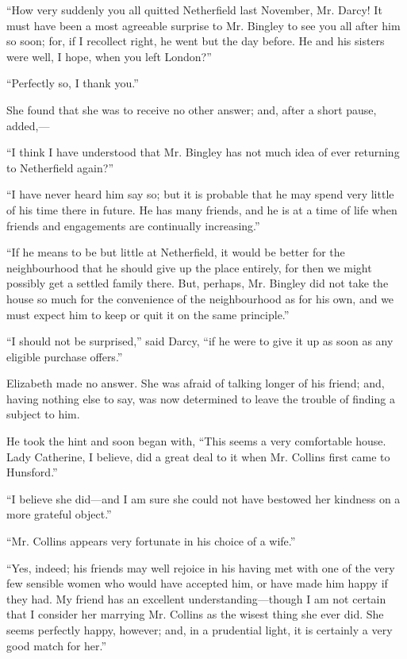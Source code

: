 \documentclass[12pt,openright]{book}
\begin{document}
“How very suddenly you all quitted Netherfield last November, Mr. Darcy! It must have been a most agreeable surprise to Mr. Bingley to see you all after him so soon; for, if I recollect right, he went but the day before. He and his sisters were well, I hope, when you left London?”

“Perfectly so, I thank you.”

She found that she was to receive no other answer; and, after a short pause, added,—

“I think I have understood that Mr. Bingley has not much idea of ever returning to Netherfield again?”

“I have never heard him say so; but it is probable that he may spend very little of his time there in future. He has many friends, and he is at a time of life when friends and engagements are continually increasing.”

“If he means to be but little at Netherfield, it would be better for the neighbourhood that he should give up the place entirely, for then we might possibly get a settled family there. But, perhaps, Mr. Bingley did not take the house so much for the convenience of the neighbourhood as for his own, and we must expect him to keep or quit it on the same principle.”

“I should not be surprised,” said Darcy, “if he were to give it up as soon as any eligible purchase offers.”

Elizabeth made no answer. She was afraid of talking longer of his friend; and, having nothing else to say, was now determined to leave the trouble of finding a subject to him.

He took the hint and soon began with, “This seems a very comfortable house. Lady Catherine, I believe, did a great deal to it when Mr. Collins first came to Hunsford.”

“I believe she did—and I am sure she could not have bestowed her kindness on a more grateful object.”

“Mr. Collins appears very fortunate in his choice of a wife.”

“Yes, indeed; his friends may well rejoice in his having met with one of the very few sensible women who would have accepted him, or have made him happy if they had. My friend has an excellent understanding—though I am not certain that I consider her marrying Mr. Collins as the wisest thing she ever did. She seems perfectly happy, however; and, in a prudential light, it is certainly a very good match for her.”
\end{document}
